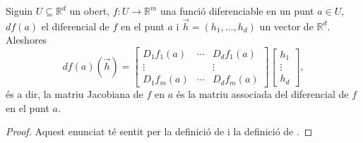\documentclass[../Apunts.tex]{subfiles}
\begin{document}
	\begin{proposition}\label{prop:justificació Jacobiana}
		Siguin \(U\subseteq\mathbb{R}^{d}\) un obert, \(f\colon U\to\mathbb{R}^{m}\) una funció diferenciable en un punt \(a\in U\), \(df(a)\) el diferencial de \(f\) en el punt \(a\) i \(\vec{h}=(h_{1},\dots,h_{d})\) un vector de \(\mathbb{R}^{d}\). Aleshores
		\[df(a)(\vec{h})=
		\left[\begin{matrix}
		D_{1}f_{1}(a) & \cdots & D_{d}f_{1}(a)\\
		\vdots && \vdots \\
		D_{1}f_{m}(a) & \cdots & D_{d}f_{m}(a)
		\end{matrix}\right]
		\left[\begin{matrix}
		h_{1}\\
		\vdots\\
		h_{d}
		\end{matrix}\right],\]
		és a dir, la matriu Jacobiana de \(f\) en \(a\) és la matriu associada del diferencial de \(f\) en el punt \(a\).
		\begin{proof}
			Aquest enunciat té sentit per la definició de  i la definició de .
			

\end{proof}
\end{proposition}
\end{document}
